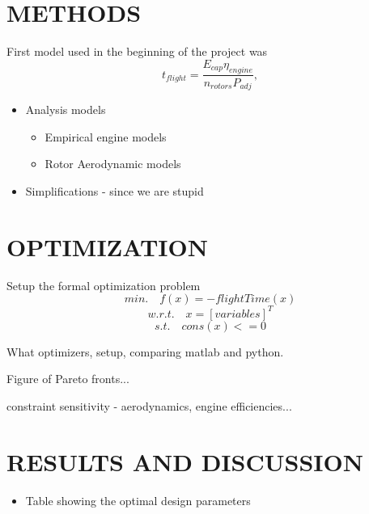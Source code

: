 \documentclass[letterpaper, 10 pt, conference]{ieeeconf}  %
\newcommand{\of}[1]{\ensuremath{\left(#1\right)}}
\begin{document}
	
\section{METHODS}

First model used in the beginning of the project was 
$$t_{flight} = \frac{E_{cap} \eta_{engine}}{n_{rotors}P_{adj}},$$

\begin{itemize}
	\item{Analysis models}
	\begin{itemize}
		\item{Empirical engine models}
		\item{Rotor Aerodynamic models}
	\end{itemize}
	\item{Simplifications - since we are stupid}
\end{itemize}

\section{OPTIMIZATION}
Setup the formal optimization problem
\begin{equation}
min. \quad f\of{x} = -flightTime\of{x}
\label{eq:objective}
\end{equation}
\begin{equation}
w.r.t. \quad x = [variables]^T
\label{eq:vars}
\end{equation}
\begin{equation}
s.t. \quad cons\of{x} <= 0 
\label{eq:constrants}
\end{equation}

What optimizers, setup, comparing matlab and python. 

Figure of Pareto fronts...

constraint sensitivity - aerodynamics, engine efficiencies...

\section{RESULTS AND DISCUSSION}

\begin{itemize}
	\item{Table showing the optimal design parameters}
\end{itemize}


\end{document}

